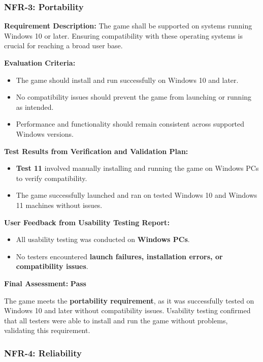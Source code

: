 \documentclass[12pt, titlepage]{article}
\begin{document}
\subsubsection{NFR-3: Portability}
\label{NFR3}

\textbf{Requirement Description:}  
The game shall be supported on systems running Windows 10 or later. Ensuring compatibility with these operating systems is crucial for reaching a broad user base.

\textbf{Evaluation Criteria:}  
\begin{itemize}
    \item The game should install and run successfully on Windows 10 and later.
    \item No compatibility issues should prevent the game from launching or running as intended.
    \item Performance and functionality should remain consistent across supported Windows versions.
\end{itemize}

\textbf{Test Results from Verification and Validation Plan:}  
\begin{itemize}
    \item \textbf{Test 11} involved manually installing and running the game on Windows PCs to verify compatibility.
    \item The game successfully launched and ran on tested Windows 10 and Windows 11 machines without issues.
\end{itemize}

\textbf{User Feedback from Usability Testing Report:}  
\begin{itemize}
    \item All usability testing was conducted on \textbf{Windows PCs}.
    \item No testers encountered \textbf{launch failures, installation errors, or compatibility issues}.
\end{itemize}

\textbf{Final Assessment:} \textbf{Pass}  

The game meets the \textbf{portability requirement}, as it was successfully tested on Windows 10 and later without compatibility issues. Usability testing confirmed that all testers were able to install and run the game without problems, validating this requirement.


\subsubsection{NFR-4: Reliability}
\label{NFR4}
\end{document}
